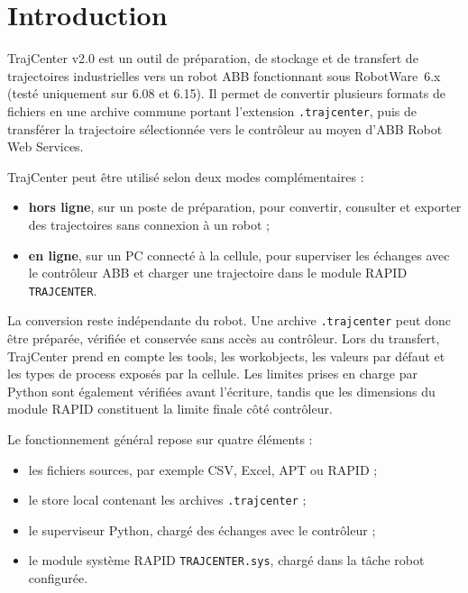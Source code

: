 \documentclass{rapportENSAM}
\begin{document}

\fairemarges








\section*{Introduction}
\label{sec:introduction}

TrajCenter v2.0 est un outil de préparation, de stockage et de transfert de trajectoires industrielles vers un robot ABB fonctionnant sous RobotWare~6.x (testé uniquement sur 6.08 et 6.15). Il permet de convertir plusieurs formats de fichiers en une archive commune portant l'extension \texttt{.trajcenter}, puis de transférer la trajectoire sélectionnée vers le contrôleur au moyen d'ABB Robot Web Services.

TrajCenter peut être utilisé selon deux modes complémentaires :

\begin{itemize}
    \item \textbf{hors ligne}, sur un poste de préparation, pour convertir,
    consulter et exporter des trajectoires sans connexion à un robot ;
    \item \textbf{en ligne}, sur un PC connecté à la cellule, pour superviser
    les échanges avec le contrôleur ABB et charger une trajectoire dans le
    module RAPID \texttt{TRAJCENTER}.
\end{itemize}

La conversion reste indépendante du robot. Une archive \texttt{.trajcenter} peut donc être préparée, vérifiée et conservée sans accès au contrôleur. Lors du transfert, TrajCenter prend en compte les tools, les workobjects, les valeurs par défaut et les types de process exposés par la
cellule. Les limites prises en charge par Python sont également vérifiées avant l'écriture, tandis que les dimensions du module RAPID constituent la limite finale côté contrôleur.

Le fonctionnement général repose sur quatre éléments :

\begin{itemize}
    \item les fichiers sources, par exemple CSV, Excel, APT ou RAPID ;
    \item le store local contenant les archives \texttt{.trajcenter} ;
    \item le superviseur Python, chargé des échanges avec le contrôleur ;
    \item le module système RAPID \texttt{TRAJCENTER.sys}, chargé dans la
    tâche robot configurée.
\end{itemize}
\end{document}
